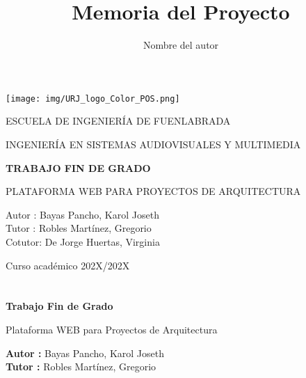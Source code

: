 \documentclass[a4paper, 12pt]{book}
\title{Memoria del Proyecto}
\author{Nombre del autor}
\begin{document}
\renewcommand{\refname}{Bibliografía}  %
\renewcommand{\appendixname}{Apéndice}



\begin{titlepage}
\begin{center}
\texttt{[image: img/URJ\_logo\_Color\_POS.png]}

\vspace{1.75cm}

\LARGE
ESCUELA DE INGENIERÍA DE FUENLABRADA
\vspace{1cm}

\LARGE
INGENIERÍA EN SISTEMAS AUDIOVISUALES Y MULTIMEDIA

\vspace{1cm}
\LARGE
\textbf{TRABAJO FIN DE GRADO}

\vspace{2cm}

\Large
PLATAFORMA WEB PARA PROYECTOS DE ARQUITECTURA

\vspace{2cm}

\large
Autor : Bayas Pancho, Karol Joseth \\
Tutor : Robles Martínez, Gregorio\\
Cotutor: De Jorge Huertas, Virginia 
\vspace{1cm}

\large
Curso académico 202X/202X

\end{center}
\end{titlepage}

\newpage
\mbox{}
\thispagestyle{empty} %



\clearpage
{}
\chapter*{}

\vspace{-4cm}
\begin{center}
\LARGE
\textbf{Trabajo Fin de Grado}

\vspace{1cm}
\large
Plataforma WEB para Proyectos de Arquitectura

\vspace{1cm}
\large
\textbf{Autor :} Bayas Pancho, Karol Joseth \\
\textbf{Tutor :} Robles Martínez, Gregorio

\end{center}
\end{document}
